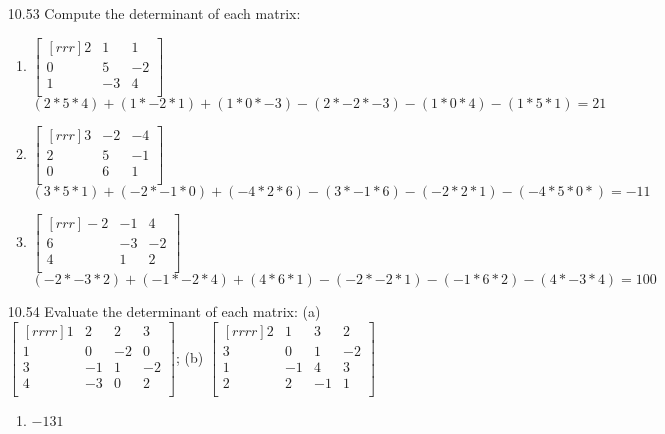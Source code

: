 \documentclass[12pt]{article}
\theoremstyle{definition}
\theoremstyle{plain}
\begin{document}
\begin{enumerate}
\item[10.53]Compute the determinant of each matrix:
	\begin{enumerate}
	\item $\begin{bmatrix}[rrr]2&1&1\\0&5&-2\\1&-3&4\\\end{bmatrix}$
	\[ (2*5*4)+(1*-2*1)+(1*0*-3)-(2*-2*-3)-(1*0*4)-(1*5*1) = 21 \]
	\item $\begin{bmatrix}[rrr]3&-2&-4\\2&5&-1\\0&6&1\\\end{bmatrix}$
	\[ (3*5*1)+(-2*-1*0)+(-4*2*6)-(3*-1*6)-(-2*2*1)-(-4*5*0*)=-11 \]
	\item $\begin{bmatrix}[rrr]-2&-1&4\\6&-3&-2\\4&1&2\\\end{bmatrix}$
	\[ (-2*-3*2)+(-1*-2*4)+(4*6*1)-(-2*-2*1)-(-1*6*2)-(4*-3*4) = 100 \]
	\end{enumerate}

\item[10.54]Evaluate the determinant of each matrix: (a) $\begin{bmatrix}[rrrr]1&2&2&3\\1&0&-2&0\\3&-1&1&-2\\4&-3&0&2\\\end{bmatrix}$; (b) $\begin{bmatrix}[rrrr]2&1&3&2\\3&0&1&-2\\1&-1&4&3\\2&2&-1&1\\\end{bmatrix}$
	\begin{enumerate}
	\item $-131$
	\end{enumerate}


\end{enumerate}
\end{document}

